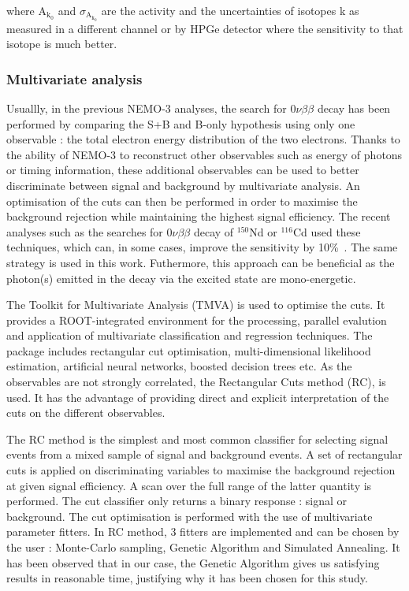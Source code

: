 \documentclass[main.tex]{subfiles}
\begin{document}
\bigskip


\NI where A$_{\text{k}_\text{0}}$ and $\sigma_{\text{A}_{\text{k}_\text{0}}}$ are the activity and the uncertainties of isotopes k as measured in a different channel or by HPGe detector where the sensitivity to that isotope is much better.


\subsubsection{Multivariate analysis}


\NI Usuallly, in the previous NEMO-3 analyses, the search for 0$\nu\beta\beta$ decay has been performed by comparing the S+B and B-only hypothesis using only one observable : the total electron energy distribution of the two electrons. Thanks to the ability of NEMO-3 to reconstruct other observables such as energy of photons or timing information, these additional observables can be used to better discriminate between signal and background by multivariate analysis. An optimisation of the cuts can then be performed in order to maximise the background rejection while maintaining the highest signal efficiency. The recent analyses such as the searches for 0$\nu\beta\beta$ decay of $^{\text{150}}$Nd or $^{\text{116}}$Cd used these techniques, which can, in some cases, improve the sensitivity by 10\%~\cite{NEMO3:Nd150}. The same strategy is used in this work. Futhermore, this approach can be beneficial as the photon(s) emitted in the decay via the excited state are mono-energetic.


\bigskip


\NI The Toolkit for Multivariate Analysis (TMVA) is used to optimise the cuts. It provides a ROOT-integrated environment for the processing, parallel evalution and application of multivariate classification and regression techniques. The package includes rectangular cut optimisation, multi-dimensional likelihood estimation, artificial neural networks, boosted decision trees etc. As the observables are not strongly correlated, the Rectangular Cuts method (RC), is used. It has the advantage of providing direct and explicit interpretation of the cuts on the different observables.


\bigskip


\NI The RC method is the simplest and most common classifier for selecting signal events from a mixed sample of signal and background events. A set of rectangular cuts is applied on discriminating variables to maximise the background rejection at given signal efficiency. A scan over the full range of the latter quantity is performed. The cut classifier only returns a binary response : signal or background. The cut optimisation is performed with the use of multivariate parameter fitters. In RC method, 3 fitters are implemented and can be chosen by the user : Monte-Carlo sampling, Genetic Algorithm and Simulated Annealing. It has been observed that in our case, the Genetic Algorithm gives us satisfying results in reasonable time, justifying why it has been chosen for this study.
\end{document}
